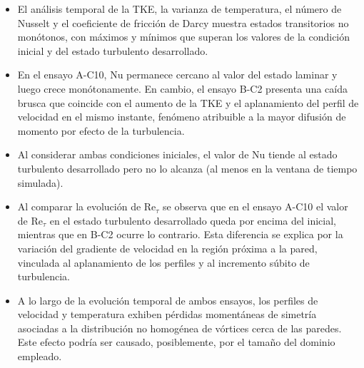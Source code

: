 \begin{itemize}

\item El análisis temporal de la TKE, la varianza de temperatura, el número de Nusselt y el coeficiente de fricción de Darcy muestra estados transitorios no monótonos, con máximos y mínimos que superan los valores de la condición inicial y del estado turbulento desarrollado.

\item En el ensayo A-C10, Nu permanece cercano al valor del estado laminar y luego crece monótonamente. En cambio, el ensayo B-C2 presenta una caída brusca que coincide con el aumento de la TKE y el aplanamiento del perfil de velocidad en el mismo instante, fenómeno atribuible a la mayor difusión de momento por efecto de la turbulencia. 

\item Al considerar ambas condiciones iniciales, el valor de Nu tiende al estado turbulento desarrollado pero no lo alcanza (al menos en la ventana de tiempo simulada). 

\item Al comparar la evolución de $\text{Re}_{\tau}$ se observa que en el ensayo A-C10 el valor de $\text{Re}_{\tau}$  en el estado turbulento desarrollado queda por encima del inicial, mientras que en B-C2 ocurre lo contrario. Esta diferencia se explica por la variación del gradiente de velocidad en la región próxima a la pared, vinculada al aplanamiento de los perfiles y al incremento súbito de turbulencia.

\item A lo largo de la evolución temporal de ambos ensayos, los perfiles de velocidad y temperatura exhiben pérdidas momentáneas de simetría asociadas a la distribución no homogénea de vórtices cerca de las paredes. Este efecto podría ser causado, posiblemente, por el tamaño del dominio empleado.

\end{itemize}


